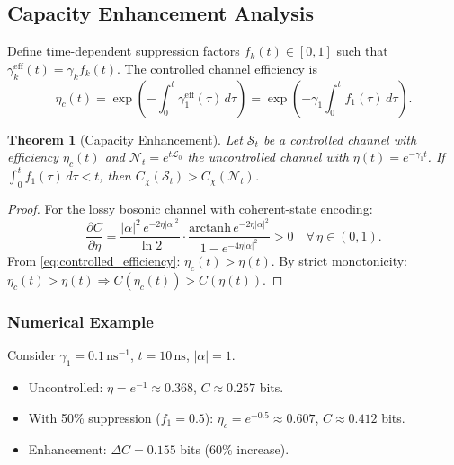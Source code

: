 \documentclass[12pt,a4paper]{article}
\theoremstyle{definition}
\theoremstyle{plain}
\newtheorem{theorem}{Theorem}[section]
\begin{document}
\subsection{Capacity Enhancement Analysis}

Define time-dependent suppression factors $f_k(t)\in[0,1]$ such that
$\gamma_k^{\mathrm{eff}}(t)=\gamma_k f_k(t)$. The controlled channel efficiency is
\begin{equation}
\eta_c(t)=\exp\!\left(-\int_0^t\gamma_1^{\mathrm{eff}}(\tau)\,d\tau\right)=\exp\!\left(-\gamma_1\int_0^t f_1(\tau)\,d\tau\right).
\label{eq:controlled_efficiency}
\end{equation}

\begin{theorem}[Capacity Enhancement]
\label{thm:capacity_enhancement}
Let $\mathcal{S}_t$ be a controlled channel with efficiency $\eta_c(t)$ and
$\mathcal{N}_t=e^{t\mathcal{L}_0}$ the uncontrolled channel with $\eta(t)=e^{-\gamma_1 t}$.
If $\int_0^t f_1(\tau)\,d\tau<t$, then $C_\chi(\mathcal{S}_t)>C_\chi(\mathcal{N}_t)$.
\end{theorem}

\begin{proof}
For the lossy bosonic channel with coherent-state encoding:
\begin{equation}
\frac{\partial C}{\partial\eta}=\frac{|\alpha|^2\,e^{-2\eta|\alpha|^2}}{\ln2}\cdot\frac{\mathrm{arctanh}\,e^{-2\eta|\alpha|^2}}{1-e^{-4\eta|\alpha|^2}}>0 \quad\forall\,\eta\in(0,1).
\end{equation}
From \cref{eq:controlled_efficiency}: $\eta_c(t)>\eta(t)$. By strict monotonicity:
$\eta_c(t)>\eta(t)\Rightarrow C(\eta_c(t))>C(\eta(t))$.
\end{proof}

\subsubsection{Numerical Example}

Consider $\gamma_1=0.1\,\mathrm{ns}^{-1}$, $t=10\,\mathrm{ns}$, $|\alpha|=1$.
\begin{itemize}
  \item Uncontrolled: $\eta=e^{-1}\approx0.368$, $C\approx0.257$ bits.
  \item With 50\% suppression ($f_1=0.5$): $\eta_c=e^{-0.5}\approx0.607$, $C\approx0.412$ bits.
  \item Enhancement: $\Delta C=0.155$ bits (60\% increase).
\end{itemize}
\end{document}
